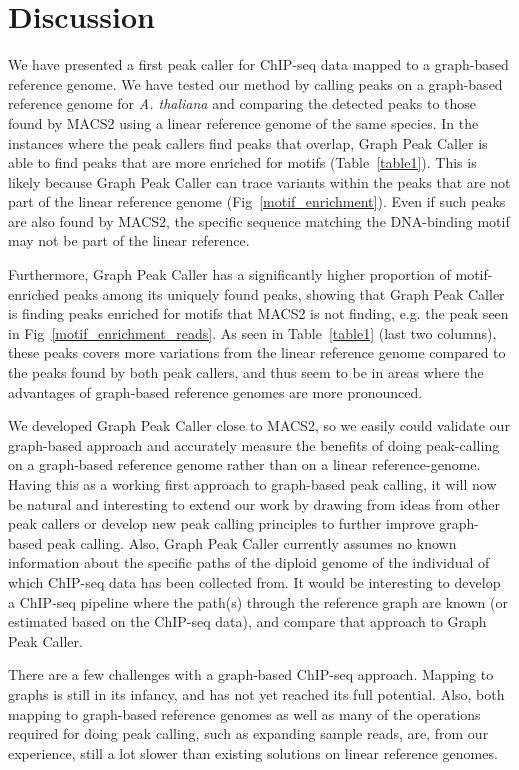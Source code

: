 \documentclass[10pt,letterpaper]{article}
\begin{document}
\section*{Discussion}
We have presented a first peak caller for ChIP-seq data mapped to a graph-based reference genome. We have tested our method by calling peaks on a graph-based reference genome for \emph{A. thaliana} and comparing the detected peaks to those found by MACS2 using a linear reference genome of the same species. In the instances where the peak callers find peaks that overlap, Graph Peak Caller is able to find peaks that are more enriched for motifs (Table~\ref{table1}). This is likely because Graph Peak Caller can trace variants within the peaks that are not part of the linear reference genome (Fig~\ref{motif_enrichment}). Even if such peaks are also found by MACS2, the specific sequence matching the DNA-binding motif may not be part of the linear reference.
	
Furthermore, Graph Peak Caller has a significantly higher proportion of motif-enriched peaks among its uniquely found peaks, showing that Graph Peak Caller is finding peaks enriched for motifs that MACS2 is not finding, e.g. the peak seen in Fig~\ref{motif_enrichment_reads}. As seen in Table~\ref{table1} (last two columns), these peaks covers more variations from the linear reference genome compared to the peaks found by both peak callers, and thus seem to be in areas where the advantages of graph-based reference genomes are more pronounced. 

We developed Graph Peak Caller close to MACS2, so we easily could validate our graph-based approach and accurately measure the benefits of doing peak-calling on a graph-based reference genome rather than on a linear reference-genome. Having this as a working first approach to graph-based peak calling, it will now be natural and interesting  to extend our work by drawing from ideas from other peak callers or develop new peak calling principles to further improve graph-based peak calling. Also, Graph Peak Caller currently assumes no known information about the specific paths of the diploid genome of the individual of which ChIP-seq data has been collected from. It would be interesting to develop a ChIP-seq pipeline where the path(s) through the reference graph are known (or estimated based on the ChIP-seq data), and compare that approach to Graph Peak Caller.

There are a few challenges with a graph-based ChIP-seq approach. Mapping to graphs is still in its infancy, and has not yet reached its full potential. Also, both mapping to graph-based reference genomes as well as many of the operations required for doing peak calling, such as expanding sample reads, are, from our experience, still a lot slower than existing solutions on linear reference genomes. 
\end{document}
